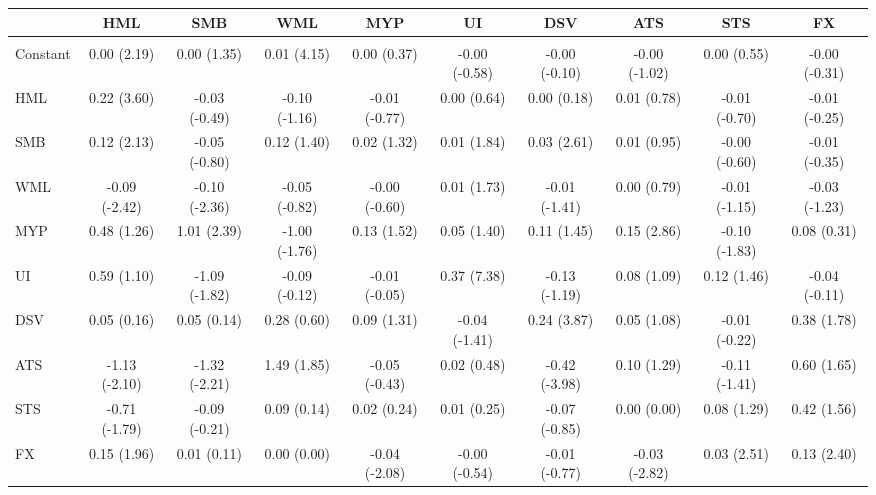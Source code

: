 \begin{sidewaystable}
\centering
\begin{tabular}{l*{9}{c}}
\hline
& HML& SMB& WML& MYP& UI& DSV& ATS& STS& FX\\
\hline
\\
Constant & 0.00 (2.19) & 0.00 (1.35) & 0.01 (4.15) & 0.00 (0.37) & -0.00 (-0.58) & -0.00 (-0.10) & -0.00 (-1.02) & 0.00 (0.55) & -0.00 (-0.31)\\
HML & 0.22 (3.60) & -0.03 (-0.49) & -0.10 (-1.16) & -0.01 (-0.77) & 0.00 (0.64) & 0.00 (0.18) & 0.01 (0.78) & -0.01 (-0.70) & -0.01 (-0.25)\\
SMB & 0.12 (2.13) & -0.05 (-0.80) & 0.12 (1.40) & 0.02 (1.32) & 0.01 (1.84) & 0.03 (2.61) & 0.01 (0.95) & -0.00 (-0.60) & -0.01 (-0.35)\\
WML & -0.09 (-2.42) & -0.10 (-2.36) & -0.05 (-0.82) & -0.00 (-0.60) & 0.01 (1.73) & -0.01 (-1.41) & 0.00 (0.79) & -0.01 (-1.15) & -0.03 (-1.23)\\
MYP & 0.48 (1.26) & 1.01 (2.39) & -1.00 (-1.76) & 0.13 (1.52) & 0.05 (1.40) & 0.11 (1.45) & 0.15 (2.86) & -0.10 (-1.83) & 0.08 (0.31)\\
UI & 0.59 (1.10) & -1.09 (-1.82) & -0.09 (-0.12) & -0.01 (-0.05) & 0.37 (7.38) & -0.13 (-1.19) & 0.08 (1.09) & 0.12 (1.46) & -0.04 (-0.11)\\
DSV & 0.05 (0.16) & 0.05 (0.14) & 0.28 (0.60) & 0.09 (1.31) & -0.04 (-1.41) & 0.24 (3.87) & 0.05 (1.08) & -0.01 (-0.22) & 0.38 (1.78)\\
ATS & -1.13 (-2.10) & -1.32 (-2.21) & 1.49 (1.85) & -0.05 (-0.43) & 0.02 (0.48) & -0.42 (-3.98) & 0.10 (1.29) & -0.11 (-1.41) & 0.60 (1.65)\\
STS & -0.71 (-1.79) & -0.09 (-0.21) & 0.09 (0.14) & 0.02 (0.24) & 0.01 (0.25) & -0.07 (-0.85) & 0.00 (0.00) & 0.08 (1.29) & 0.42 (1.56)\\
FX & 0.15 (1.96) & 0.01 (0.11) & 0.00 (0.00) & -0.04 (-2.08) & -0.00 (-0.54) & -0.01 (-0.77) & -0.03 (-2.82) & 0.03 (2.51) & 0.13 (2.40)\\
\hline
\end{tabular}
\end{sidewaystable}
